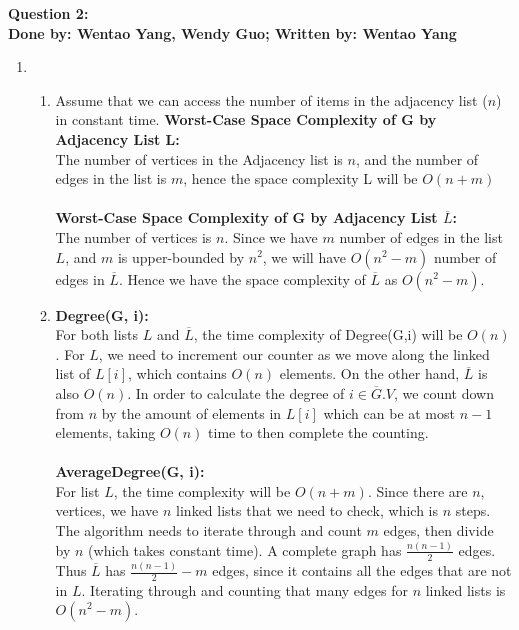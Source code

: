 \documentclass[20pt]{article}
\begin{document}
\noindent
\textbf{Question 2:}\\
\textbf{Done by: Wentao Yang, Wendy Guo; Written by: Wentao Yang}\\
\noindent
\begin{enumerate} [label=(\alph*)]


    \item
    \begin{enumerate} [label=(\arabic*)]
        \item{Assume that we can access the number of items in the adjacency list ($n$) in constant time.}
        {\textbf{Worst-Case Space Complexity of G by Adjacency List L:}}\\
        The number of vertices in the Adjacency list is $n$, and the number of edges in the list is $m$, hence the space complexity L will be $O(n+m)$ \\\\
        \textbf{Worst-Case Space Complexity of G by Adjacency List $\overline{L}$:}\\
        The number of vertices is $n$. Since we have $m$ number of edges in the list $L$, and $m$ is upper-bounded by $n^2$, we will have $O(n^2 - m)$ number of edges in $\overline{L}$. Hence we have the space complexity of $\overline{L}$ as $O(n^2 - m)$.
        \item
            \textbf{Degree(G, i):}\\
            For both lists $L$ and $\overline{L}$, the time complexity of Degree(G,i) will be $O(n)$. For $L$, we need to increment our counter as we move along the linked list of $L[i]$, which contains $O(n)$ elements. On the other hand, $\overline{L}$ is also $O(n)$. In order to calculate the degree of $i\in\overline{G}.V$, we count down from $n$ by the amount of elements in $L[i]$ which can be at most $n-1$ elements, taking $O(n)$ time to then complete the counting.\\\\
            \textbf{AverageDegree(G, i):}\\
            For list $L$, the time complexity will be $O(n + m)$. Since there are $n$, vertices, we have $n$ linked lists that we need to check, which is $n$ steps. The algorithm needs to iterate through and count $m$ edges, then divide by $n$ (which takes constant time). A complete graph has $\frac{n(n-1)}{2}$ edges. Thus $\overline{L}$ has $\frac{n(n-1)}{2} - m$ edges, since it contains all the edges that are not in $L$. Iterating through and counting that many edges for $n$ linked lists is $O(n^2 - m).$ \\\\

\end{enumerate}
\end{enumerate}
\end{document}
